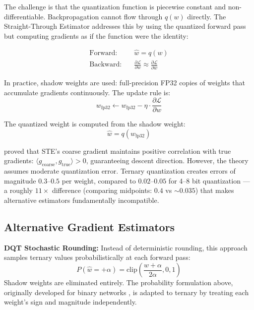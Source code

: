 \documentclass{article}
\begin{document}
The challenge is that the quantization function is piecewise constant and non-differentiable. Backpropagation cannot flow through $q(w)$ directly. The Straight-Through Estimator addresses this by using the quantized forward pass but computing gradients as if the function were the identity:

\begin{align}
\text{Forward:} \quad &\hat{w} = q(w) \\
\text{Backward:} \quad &\frac{\partial \mathcal{L}}{\partial w} \approx \frac{\partial \mathcal{L}}{\partial \hat{w}}
\end{align}

In practice, shadow weights are used: full-precision FP32 copies of weights that accumulate gradients continuously. The update rule is:
\begin{equation}
w_\text{fp32} \leftarrow w_\text{fp32} - \eta \cdot \frac{\partial \mathcal{L}}{\partial w}
\end{equation}

The quantized weight is computed from the shadow weight:
\begin{equation}
\hat{w} = q(w_\text{fp32})
\end{equation}

\citet{yin2019understanding} proved that STE's coarse gradient maintains positive correlation with true gradients: $\langle g_\text{coarse}, g_\text{true} \rangle > 0$, guaranteeing descent direction. However, the theory assumes moderate quantization error. Ternary quantization creates errors of magnitude $0.3$--$0.5$ per weight, compared to $0.02$--$0.05$ for 4--8 bit quantization --- a roughly $11\times$ difference (comparing midpoints: $0.4$ vs ${\sim}0.035$) that makes alternative estimators fundamentally incompatible.

\subsection{Alternative Gradient Estimators}

\textbf{DQT Stochastic Rounding:} Instead of deterministic rounding, this approach samples ternary values probabilistically at each forward pass:
\begin{equation}
P(\hat{w} = +\alpha) = \text{clip}\left(\frac{w + \alpha}{2\alpha}, 0, 1\right)
\end{equation}
Shadow weights are eliminated entirely. The probability formulation above, originally developed for binary networks \citep{hubara2016binarized, courbariaux2015binaryconnect}, is adapted to ternary by treating each weight's sign and magnitude independently.
\end{document}
